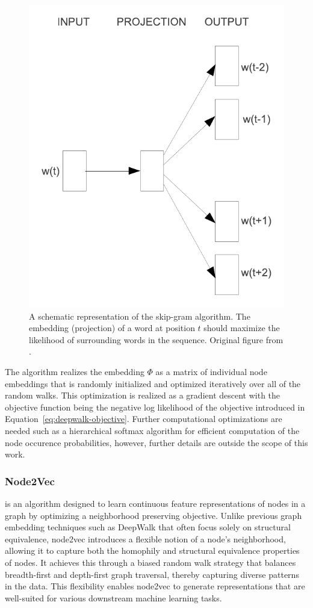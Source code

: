 \begin{figure}
	\includegraphics[width=0.6\linewidth]{images/skip-gram.pdf}
	\caption{A schematic representation of the skip-gram algorithm. The embedding (projection) of a word at position \( t \) should maximize the likelihood of surrounding words in the sequence. Original figure from \cite{mikolov_efficient_2013}.}
	\label{fig:skip-gram}
\end{figure}

The algorithm realizes the embedding \( \Phi \) as a matrix of individual node embeddings that is randomly initialized and optimized iteratively over all of the random walks. This optimization is realized as a gradient descent with the objective function being the negative log likelihood of the objective introduced in Equation~\ref{eq:deepwalk-objective}. Further computational optimizations are needed such as a hierarchical softmax algorithm for efficient computation of the node occurence probabilities, however, further details are outside the scope of this work.

\subsubsection{Node2Vec}

 is an algorithm designed to learn continuous feature representations of nodes in a graph by optimizing a neighborhood preserving objective. Unlike previous graph embedding techniques such as DeepWalk that often focus solely on structural equivalence, node2vec introduces a flexible notion of a node's neighborhood, allowing it to capture both the homophily and structural equivalence properties of nodes. It achieves this through a biased random walk strategy that balances breadth-first and depth-first graph traversal, thereby capturing diverse patterns in the data. This flexibility enables node2vec to generate representations that are well-suited for various downstream machine learning tasks.

